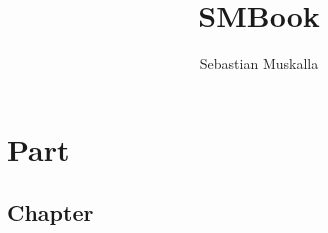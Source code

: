 \documentclass
[
    folder=../style,
    a4paper,
    12pt,
    parskip=half-,
    numbers=noenddot,
]{../style/smbook}
\title
{
    SMBook
}
\author
{
    Sebastian Muskalla
}
\begin{document}


\newpage
\part{Part}
\chapter{Chapter}










































\end{document}
